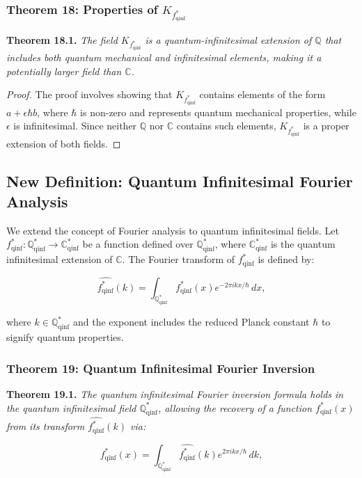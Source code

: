\documentclass{article}
\begin{document}
\subsubsection{Theorem 18: Properties of \(K_{f_{\text{qinf}}^*}\)}
\textbf{Theorem 18.1.} \textit{The field \(K_{f_{\text{qinf}}^*}\) is a quantum-infinitesimal extension of \(\mathbb{Q}\) that includes both quantum mechanical and infinitesimal elements, making it a potentially larger field than \(\mathbb{C}\).}

\begin{proof}
The proof involves showing that \(K_{f_{\text{qinf}}^*}\) contains elements of the form \(a + \epsilon \hbar b\), where \(\hbar\) is non-zero and represents quantum mechanical properties, while \(\epsilon\) is infinitesimal. Since neither \(\mathbb{Q}\) nor \(\mathbb{C}\) contains such elements, \(K_{f_{\text{qinf}}^*}\) is a proper extension of both fields.
\end{proof}

\subsection{New Definition: Quantum Infinitesimal Fourier Analysis}
We extend the concept of Fourier analysis to quantum infinitesimal fields. Let \(f_{\text{qinf}}^*: \mathbb{Q}_{\text{qinf}}^* \to \mathbb{C}_{\text{qinf}}^*\) be a function defined over \(\mathbb{Q}_{\text{qinf}}^*\), where \(\mathbb{C}_{\text{qinf}}^*\) is the quantum infinitesimal extension of \(\mathbb{C}\). The Fourier transform of \(f_{\text{qinf}}^*\) is defined by:

\[
\widehat{f_{\text{qinf}}^*}(k) = \int_{\mathbb{Q}_{\text{qinf}}^*} f_{\text{qinf}}^*(x) e^{-2\pi i k x / \hbar} \, dx,
\]

where \(k \in \mathbb{Q}_{\text{qinf}}^*\) and the exponent includes the reduced Planck constant \(\hbar\) to signify quantum properties.

\subsubsection{Theorem 19: Quantum Infinitesimal Fourier Inversion}
\textbf{Theorem 19.1.} \textit{The quantum infinitesimal Fourier inversion formula holds in the quantum infinitesimal field \(\mathbb{Q}_{\text{qinf}}^*\), allowing the recovery of a function \(f_{\text{qinf}}^*(x)\) from its transform \(\widehat{f_{\text{qinf}}^*}(k)\) via:}

\[
f_{\text{qinf}}^*(x) = \int_{\mathbb{Q}_{\text{qinf}}^*} \widehat{f_{\text{qinf}}^*}(k) e^{2\pi i k x / \hbar} \, dk,
\]
\end{document}
